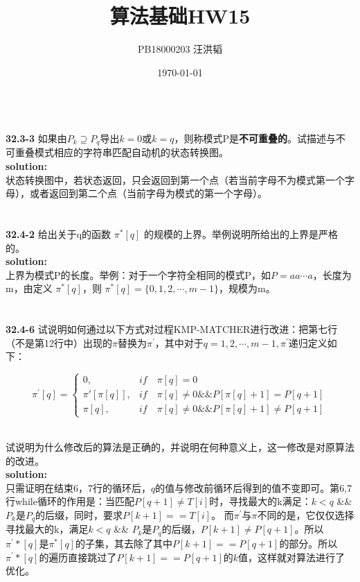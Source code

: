 \documentclass[UTF8]{ctexart}
\title{算法基础HW15}
\author{PB18000203 汪洪韬}
\date{\today}
\begin{document}
\maketitle

    ~\\
	\textbf{32.3-3} \quad 如果由$P_k \supseteq P_q$导出$k=0$或$k=q$，则称模式P是\textbf{不可重叠的}。试描述与不可重叠模式相应的字符串匹配自动机的状态转换图。\\
	\textbf{solution:} \\  
	\indent\setlength{\parindent}{1em}状态转换图中，若状态返回，只会返回到第一个点（若当前字母不为模式第一个字母），或者返回到第二个点（当前字母为模式的第一个字母）。\\\\\\
	
	\noindent\textbf{32.4-2} \quad 给出关于q的函数 $\pi^*[q]$ 的规模的上界。举例说明所给出的上界是严格的。\\
	\textbf{solution:} \\ 
	\indent\setlength{\parindent}{1em}上界为模式P的长度。举例：对于一个字符全相同的模式P，如$P=aa\cdots a$，长度为m，由定义 $\pi^*[q]$，则 $\pi^*[q] = \{0,1,2,\cdots ,m-1\}$，规模为m。\\\\\\
	
	\noindent\textbf{32.4-6} \quad 试说明如何通过以下方式对过程KMP-MATCHER进行改进：把第七行（不是第12行中）出现的$\pi$替换为$\pi^\prime$，其中对于$q=1,2,\cdots ,m-1,\pi^\prime$递归定义如下：
	\begin{center}
	$$\pi^\prime[q]=\left\{
	\begin{array}{rcl}
		0,                            &  {if \quad \pi[q]=0} \\
		\pi'[\pi[q]],                 &  {if \quad \pi[q]\ne0 \&\& P[\pi[q]+1]=P[q+1]} \\
		\pi[q],                       &  {if \quad \pi[q]\ne0 \&\& P[\pi[q]+1]\ne P[q+1]}
	\end{array}\right.$$
    \end{center}
	~\\试说明为什么修改后的算法是正确的，并说明在何种意义上，这一修改是对原算法的改进。\\
	\noindent\textbf{solution:} \\  
	\indent\setlength{\parindent}{1em}只需证明在结束6，7行的循环后，$q$的值与修改前循环后得到的值不变即可。第6,7行while循环的作用是：当匹配$P[q+1]\ne T[i]$时，寻找最大的k满足：$k < q$ \&\& $P_k$是$P_q$的后缀，同时，要求$P[k+1] == T[i]$。
	而$\pi^\prime$与$\pi$不同的是，它仅仅选择寻找最大的k，满足$k < q$ \&\& $P_k$是$P_q$的后缀，$P[k+1] \ne P[q+1]$。所以$\pi^\prime*[q]$是$\pi^*[q]$的子集，其去除了其中$P[k+1] == P[q+1]$的部分。所以$\pi^\prime*[q]$的遍历直接跳过了$P[k+1] == P[q+1]$的$k$值，这样就对算法进行了优化。\\\\\\
    
\end{document}

